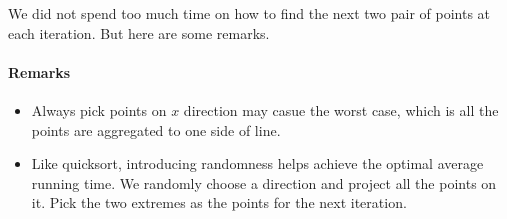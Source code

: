 We did not spend too much time on how to find the next two pair of points at 
each iteration. But here are some remarks.

\paragraph{Remarks}
\begin{itemize}
 \item Always pick points on $x$ direction may casue the worst case, which is 
all the points are aggregated to one side of line.
\item Like quicksort, introducing randomness helps achieve the optimal average 
running time. We randomly choose a direction and project all the points on it. 
Pick the two extremes as the points for the next iteration.
\end{itemize}